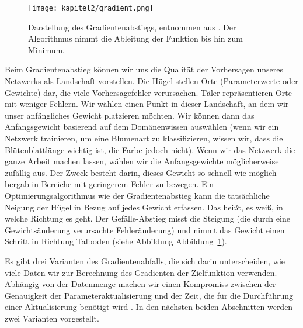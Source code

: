     \begin{figure}[H]
      \centering
      \texttt{[image: kapitel2/gradient.png]}
      \caption[Der Gradientenabstieg]{Darstellung des Gradientenabstiegs, entnommen aus \cite*{IanGoodfellowYoshuaBengio2016}. Der Algorithmus nimmt die Ableitung der Funktion bis hin zum Minimum.}
      \label{Kap2:Grad}
    \end{figure}

    Beim Gradientenabstieg können wir uns die Qualität der Vorhersagen unseres Netzwerks als Landschaft vorstellen. Die Hügel stellen Orte (Parameterwerte oder Gewichte) dar, die viele Vorhersagefehler verursachen. Täler repräsentieren Orte mit weniger Fehlern. Wir wählen einen Punkt in dieser Landschaft, an dem wir unser anfängliches Gewicht platzieren möchten. Wir können dann das Anfangsgewicht basierend auf dem Domänenwissen auswählen (wenn wir ein Netzwerk trainieren, um eine Blumenart zu klassifizieren, wissen wir, dass die Blütenblattlänge wichtig ist, die Farbe jedoch nicht). Wenn wir das Netzwerk die ganze Arbeit machen lassen, wählen wir die Anfangsgewichte möglicherweise zufällig aus. Der Zweck besteht darin, dieses Gewicht so schnell wie möglich bergab in Bereiche mit geringerem Fehler zu bewegen. Ein Optimierungsalgorithmus wie der Gradientenabstieg kann die tatsächliche Neigung der Hügel in Bezug auf jedes Gewicht erfassen. Das heißt, es weiß, in welche Richtung es geht. Der Gefälle-Abstieg misst die Steigung (die durch eine Gewichtsänderung verursachte Fehleränderung) und nimmt das Gewicht einen Schritt in Richtung Talboden \cite*[34]{Patterson2019} (siehe Abbildung Abbildung~\ref{Kap2:Grad}).



    Es gibt drei Varianten des Gradientenabfalls, die sich darin unterscheiden, wie viele Daten wir zur Berechnung des Gradienten der Zielfunktion verwenden. Abhängig von der Datenmenge machen wir einen Kompromiss zwischen der Genauigkeit der Parameteraktualisierung und der Zeit, die für die Durchführung einer Aktualisierung benötigt wird \cite*{Ruder2016}. In den nächsten beiden Abschnitten werden zwei Varianten vorgestellt.

